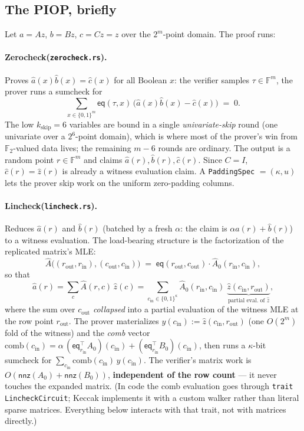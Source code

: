 \documentclass[11pt]{article}
\newcommand{\F}{\mathbb{F}}                       %
\newcommand{\Ftwo}{\F_2}
\newcommand{\eq}{\mathsf{eq}}
\newcommand{\nnz}{\mathsf{nnz}}
\newcommand{\code}[1]{\texttt{#1}}
\newcommand{\ZC}{\textsf{Zerocheck}\xspace}
\newcommand{\LC}{\textsf{Lincheck}\xspace}
\newcommand{\out}{\mathrm{out}}
\newcommand{\inn}{\mathrm{in}}
\theoremstyle{definition}
\begin{document}
\subsection{The PIOP, briefly}\label{sec:pioponetable}

Let $a = Az$, $b = Bz$, $c = Cz = z$ over the $2^m$-point domain. The proof
runs:

\paragraph{\ZC (\code{zerocheck.rs}).} Proves $\hat a(x)\hat b(x) = \hat c(x)$
for all Boolean $x$: the verifier samples $\tau \in \F^{m}$, the prover runs a
sumcheck for
\begin{equation}\label{eq:zc-single}
  \sum_{x \in \{0,1\}^{m}} \eq(\tau, x)\,
     \bigl(\hat a(x)\hat b(x) - \hat c(x)\bigr) \;=\; 0 .
\end{equation}
The low $k_{\mathrm{skip}} = 6$ variables are bound in a single
\emph{univariate-skip} round (one univariate over a $2^{6}$-point domain),
which is where most of the prover's win from $\Ftwo$-valued data lives; the
remaining $m - 6$ rounds are ordinary. The output is a random point
$r \in \F^{m}$ and claims $\hat a(r), \hat b(r), \hat c(r)$. Since $C = I$,
$\hat c(r) = \hat z(r)$ is already a witness evaluation claim. A
\code{PaddingSpec} $= (\kappa, u)$ lets the prover skip work on the uniform
zero-padding columns.

\paragraph{\LC (\code{lincheck.rs}).} Reduces $\hat a(r)$ and $\hat b(r)$
(batched by a fresh $\alpha$: the claim is $\alpha\hat a(r) + \hat b(r)$) to a
witness evaluation. The load-bearing structure is the factorization of the
replicated matrix's MLE:
\begin{equation}\label{eq:factor-single}
  \hat A\bigl((r_{\out}, r_{\inn}), (c_{\out}, c_{\inn})\bigr)
  \;=\; \eq(r_{\out}, c_{\out}) \cdot \hat A_0(r_{\inn}, c_{\inn}),
\end{equation}
so that
\[
  \hat a(r) = \sum_{c} \hat A(r, c)\,\hat z(c)
  = \sum_{c_{\inn} \in \{0,1\}^{\kappa}}
      \hat A_0(r_{\inn}, c_{\inn})\;
      \underbrace{\hat z(c_{\inn}, r_{\out})}_{\text{partial eval.\ of } \hat z},
\]
where the sum over $c_{\out}$ \emph{collapsed} into a partial evaluation of
the witness MLE at the row point $r_{\out}$. The prover materializes
$y(c_{\inn}) := \hat z(c_{\inn}, r_{\out})$ (one $O(2^m)$ fold of the witness)
and the \emph{comb} vector
$\mathrm{comb}(c_{\inn}) = \alpha\,(\eq_{r_{\inn}}^{\top} A_0)(c_{\inn})
 + (\eq_{r_{\inn}}^{\top} B_0)(c_{\inn})$,
then runs a $\kappa$-bit sumcheck for
$\sum_{c_{\inn}} \mathrm{comb}(c_{\inn})\, y(c_{\inn})$. The verifier's matrix
work is $O(\nnz(A_0) + \nnz(B_0))$, \textbf{independent of the row count} ---
it never touches the expanded matrix. (In code the comb evaluation goes
through \code{trait LincheckCircuit}; Keccak implements it with a custom
walker rather than literal sparse matrices. Everything below interacts with
that trait, not with matrices directly.)
\end{document}
